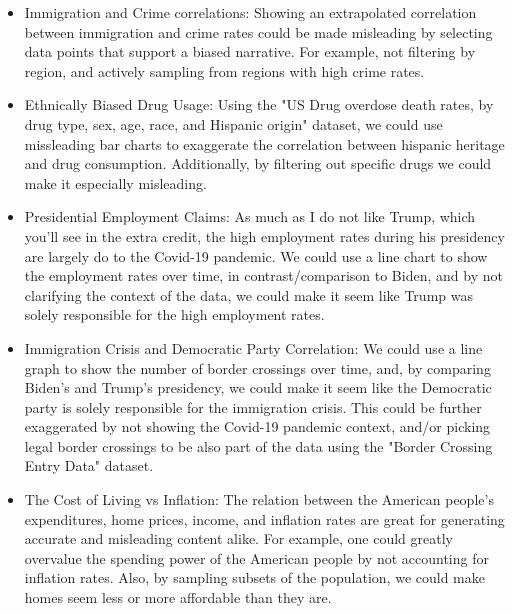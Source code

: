 \documentclass{article}
\begin{document}
\begin{itemize}
  \item Immigration and Crime correlations: 
  Showing an extrapolated correlation between immigration and crime rates 
  could be made misleading by selecting data points that support a biased narrative.
  For example, not filtering by region, and actively sampling from regions with high crime rates.

  \item Ethnically Biased Drug Usage: 
  Using the "US Drug overdose death rates, by drug type, sex, age, race, and Hispanic origin" 
  \cite{drugOverdoseDeathRates} dataset, we could use missleading bar charts to exaggerate the 
  correlation between hispanic heritage and drug consumption. Additionally, by 
  filtering out specific drugs we could make it especially misleading.

  \item Presidential Employment Claims:
  As much as I do not like Trump, which you'll see in the extra credit,
  the high employment rates during his presidency are largely do to the Covid-19 pandemic.
  We could use a line chart to show the employment rates over time, in contrast/comparison to Biden, 
  and by not clarifying the context of the data, we could make it seem like Trump 
  was solely responsible for the high employment rates.

  \item Immigration Crisis and Democratic Party Correlation:
  We could use a line graph to show the number of border crossings over time, and, by comparing
  Biden's and Trump's presidency, we could make it seem like the Democratic party is solely 
  responsible for the immigration crisis. This could be further exaggerated by not showing the
  Covid-19 pandemic context, and/or picking legal border crossings to be also part of the data using
  the "Border Crossing Entry Data" \cite{borderCrossingEntryData} dataset. 
  
  \item The Cost of Living vs Inflation: 
  The relation between the American people's expenditures, home prices, income, and inflation rates
  are great for generating accurate and misleading content alike. For example, one could
  greatly overvalue the spending power of the American people by not accounting for inflation rates.
  Also, by sampling subsets of the population, we could make homes seem less or more affordable than they are.
\end{itemize}
\end{document}
